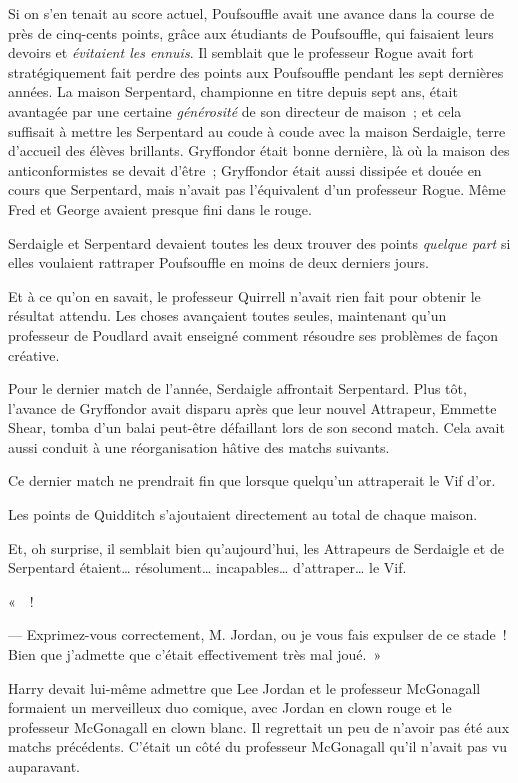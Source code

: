 Si on s'en tenait au score actuel, Poufsouffle avait une avance dans la course de près de cinq-cents points, grâce aux étudiants de Poufsouffle, qui faisaient leurs devoirs et \emph{évitaient les ennuis}. Il semblait que le professeur Rogue avait fort stratégiquement fait perdre des points aux Poufsouffle pendant les sept dernières années. La maison Serpentard, championne en titre depuis sept ans, était avantagée par une certaine \emph{générosité} de son directeur de maison~; et cela suffisait à mettre les Serpentard au coude à coude avec la maison Serdaigle, terre d'accueil des élèves brillants. Gryffondor était bonne dernière, là où la maison des anticonformistes se devait d'être~; Gryffondor était aussi dissipée et douée en cours que Serpentard, mais n'avait pas l'équivalent d'un professeur Rogue. Même Fred et George avaient presque fini dans le rouge.

Serdaigle et Serpentard devaient toutes les deux trouver des points \emph{quelque part} si elles voulaient rattraper Poufsouffle en moins de deux derniers jours.

Et à ce qu'on en savait, le professeur Quirrell n'avait rien fait pour obtenir le résultat attendu. Les choses avançaient toutes seules, maintenant qu'un professeur de Poudlard avait enseigné comment résoudre ses problèmes de façon créative.

Pour le dernier match de l'année, Serdaigle affrontait Serpentard. Plus tôt, l'avance de Gryffondor avait disparu après que leur nouvel Attrapeur, Emmette Shear, tomba d'un balai peut-être défaillant lors de son second match. Cela avait aussi conduit à une réorganisation hâtive des matchs suivants.

Ce dernier match ne prendrait fin que lorsque quelqu'un attraperait le Vif d'or.

Les points de Quidditch s'ajoutaient directement au total de chaque maison.

Et, oh surprise, il semblait bien qu'aujourd'hui, les Attrapeurs de Serdaigle et de Serpentard étaient… résolument… incapables… d'attraper… le Vif.

«~~!

--- Exprimez-vous correctement, M. Jordan, ou je vous fais expulser de ce stade~! Bien que j'admette que c'était effectivement très mal joué.~»

Harry devait lui-même admettre que Lee Jordan et le professeur McGonagall formaient un merveilleux duo comique, avec Jordan en clown rouge et le professeur McGonagall en clown blanc. Il regrettait un peu de n'avoir pas été aux matchs précédents. C'était un côté du professeur McGonagall qu'il n'avait pas vu auparavant.


